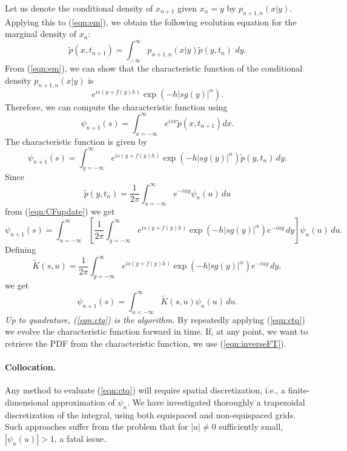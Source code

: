 \documentclass[11pt,letterpaper]{article}
\begin{document}
Let us denote the conditional density of $x_{n+1}$ given $x_n = y$ by $p_{n+1, n}(x | y)$.  Applying this to (\ref{eqn:em}), we obtain the following evolution equation for the marginal density of $x_n$:
\begin{equation}
\label{dtq}
\widetilde{p}(x, t_{n+1})=\int_{-\infty}^\infty p_{n+1, n}(x | y ) \widetilde{p}(y, t_n) \, \, dy.
\end{equation}
\noindent
From (\ref{eqn:em}), we can show that the characteristic function of the conditional density $p_{n+1, n}(x | y )$  is
\[
e^{is \left(y+ f(y)h \right)}\exp (- h |s g(y)|^{\alpha} ).
\]
Therefore, we can compute the characteristic function using
\begin{equation}
\label{eqn:CFdefn}
\psi_{n+1}(s) = \int_{x=-\infty}^{\infty}e^{isx}\widetilde{p}(x,t_{n+1})dx.
\end{equation}
The characteristic function is given by
\begin{equation}
\label{eqn:CFupdate}
\psi_{n+1}(s) = \int_{y=-\infty}^{\infty}e^{is\left(y+f(y)h\right)}\exp{\left(  -h |s g(y)|^{\alpha} \right)}\widetilde{p}(y, t_n) \, dy.
\end{equation}
Since
\begin{equation}
\label{eqn:inverseFT}
\widetilde{p}(y, t_n) = \frac{1}{2\pi}\int_{u=-\infty}^{\infty}e^{-iuy}\psi_{n}(u)\, du
\end{equation}
from (\ref{eqn:CFupdate}) we get
\begin{equation}
\psi_{n+1}(s) =  \int_{u=-\infty}^{\infty}\left[\frac{1}{2\pi}\int_{y=-\infty}^{\infty}e^{is\left(y+f(y)h\right)}\exp{\left(  -h |s g(y)|^{\alpha} \right)}e^{-iuy}\, dy \right]\psi_{n}(u) \, du.\nonumber
\end{equation}
Defining
\[
\widetilde{K}(s,u) = \frac{1}{2\pi}\int_{y=-\infty}^{\infty}e^{is\left(y+f(y)h\right)}\exp{\left(  -h |s g(y)|^{\alpha} \right)}e^{-iuy}\, dy,
\]
we get
\begin{equation}
\label{eqn:ctq}
\psi_{n+1}(s) =  \int_{u=-\infty}^{\infty}\widetilde{K}(s,u)\psi_{n}(u) \, du.
\end{equation}
\emph{Up to quadrature, (\ref{eqn:ctq}) is the algorithm.} By repeatedly applying (\ref{eqn:ctq}) we evolve the characteristic function forward in time.  If, at any point, we want to retrieve the PDF from the characteristic function, we use (\ref{eqn:inverseFT}).

\paragraph{Collocation.} Any method to evaluate (\ref{eqn:ctq}) will require spatial discretization, i.e., a finite-dimensional approximation of $\psi_n$.  We have investigated thoroughly a trapezoidal discretization of the integral, using both equispaced and non-equispaced grids.  Such approaches suffer from the problem that for $|u| \neq 0$ sufficiently small, $|\psi_n(u)| > 1$, a fatal issue.
\end{document}
